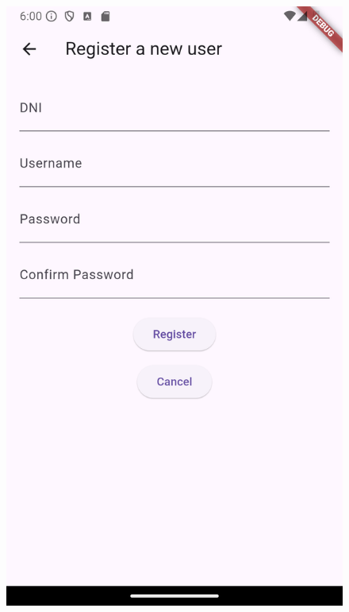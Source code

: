 \documentclass[a4paper,12pt,twoside]{ThesisStyle}
\begin{document}
\begin{figure}[h]
\begin{minipage}{0.31\textwidth}
        \includegraphics[width=\linewidth]{imatges/adminadd2.png}
    \end{minipage}
    \begin{minipage}{0.31\textwidth}

\end{minipage}
\end{figure}
\end{document}
